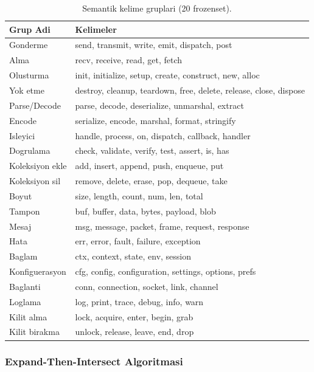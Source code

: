 \begin{table}[h]
\centering
\small
\begin{tabular}{p{3cm}p{9cm}}
\toprule
\textbf{\color{sectioncyan}Grup Adi} & \textbf{\color{sectioncyan}Kelimeler} \\
\midrule
Gonderme & send, transmit, write, emit, dispatch, post \\
Alma & recv, receive, read, get, fetch \\
Olusturma & init, initialize, setup, create, construct, new, alloc \\
Yok etme & destroy, cleanup, teardown, free, delete, release, close, dispose \\
Parse/Decode & parse, decode, deserialize, unmarshal, extract \\
Encode & serialize, encode, marshal, format, stringify \\
Isleyici & handle, process, on, dispatch, callback, handler \\
Dogrulama & check, validate, verify, test, assert, is, has \\
Koleksiyon ekle & add, insert, append, push, enqueue, put \\
Koleksiyon sil & remove, delete, erase, pop, dequeue, take \\
Boyut & size, length, count, num, len, total \\
Tampon & buf, buffer, data, bytes, payload, blob \\
Mesaj & msg, message, packet, frame, request, response \\
Hata & err, error, fault, failure, exception \\
Baglam & ctx, context, state, env, session \\
Konfiguerasyon & cfg, config, configuration, settings, options, prefs \\
Baglanti & conn, connection, socket, link, channel \\
Loglama & log, print, trace, debug, info, warn \\
Kilit alma & lock, acquire, enter, begin, grab \\
Kilit birakma & unlock, release, leave, end, drop \\
\bottomrule
\end{tabular}
\caption{Semantik kelime gruplari (20 frozenset).}
\label{tab:semantic-groups}
\end{table}

\subsubsection{Expand-Then-Intersect Algoritmasi}

